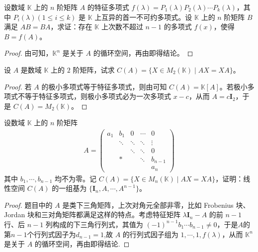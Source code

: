 \documentclass[../../main.tex]{subfiles}
\begin{document}
\begin{example}
设数域 $\mathbb{K}$ 上的 $n$ 阶矩阵 $A$ 的特征多项式 $f(\lambda)=P_1(\lambda)P_2(\lambda)\cdots P_k(\lambda)$，其中 $P_i(\lambda) (1\leqslant  i\leqslant  k)$ 是 $\mathbb{K}$ 上互异的首一不可约多项式。设 $\mathbb{K}$ 上的 $n$ 阶矩阵 $B$ 满足 $AB = BA$，求证：存在 $\mathbb{K}$ 上次数不超过 $n - 1$ 的多项式 $f(x)$，使得 $B = f(A)$。
\end{example}
\begin{proof}
由可知，$\mathbb{K}^n$ 是关于 $A$ 的循环空间，再由即得结论。
\end{proof}

\begin{example}
设 $A$ 是数域 $\mathbb{K}$ 上的 $2$ 阶矩阵，试求 $C(A)=\{X\in M_2(\mathbb{K})\mid AX = XA\}$。
\end{example}
\begin{proof}
若 $A$ 的极小多项式等于特征多项式，则由可知 $C(A)=\mathbb{K}[A]$。若极小多项式不等于特征多项式，则极小多项式必为一次多项式 $x - c$，从而 $A = c\boldsymbol{I}_2$，于是 $C(A)=M_2(\mathbb{K})$。
\end{proof}

\begin{example}
设数域 $\mathbb{K}$ 上的 $n$ 阶矩阵
\begin{align*}
A=\begin{pmatrix}
a_1 & b_1 & 0 & \cdots & 0 \\
& \ddots & \ddots & \ddots & \vdots \\
& & \ddots & \ddots & 0 \\
& * & & \ddots & b_{n - 1} \\
& & & & a_n
\end{pmatrix}
\end{align*}
其中 $b_1,\cdots,b_{n - 1}$ 均不为零。记 $C(A)=\{X\in M_n(\mathbb{K})\mid AX = XA\}$，证明：线性空间 $C(A)$ 的一组基为 $\{\boldsymbol{I}_n,A,\cdots,A^{n - 1}\}$。
\end{example}
\begin{proof}
题目中的 $A$ 是类下三角矩阵，上次对角元全部非零，比如 Frobenius 块、Jordan 块和三对角矩阵都满足这样的特点。考虑特征矩阵 $\lambda\boldsymbol{I}_n - A$ 的前 $n - 1$ 行、后 $n - 1$ 列构成的下三角行列式，其值为 $(-1)^{n - 1}b_1\cdots b_{n - 1}\neq 0$，于是$A$的第$n-1$个行列式因子为$d_{n-1}=1$,故 $A$ 的行列式因子组为 $1,\cdots,1,f(\lambda)$，从而 $\mathbb{K}^n$ 是关于 $A$ 的循环空间，再由即得结论.
\end{proof}
\end{document}
